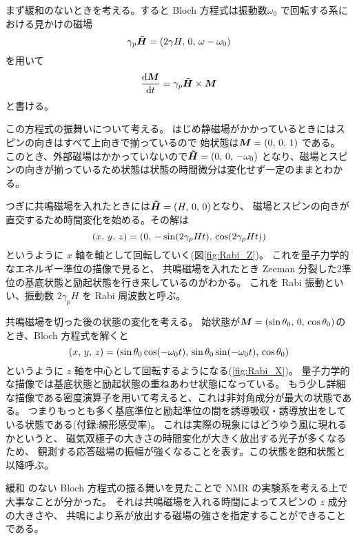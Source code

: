 \documentclass[11pt,dvipdfmx,a4paper]{jsarticle}
\begin{document}
まず緩和のないときを考える。すると Bloch 方程式は振動数\(\omega_0\) %
で回転する系における見かけの磁場
\begin{equation}
	\gamma_p \vb*{\tilde{H}} = \qty(2\gamma H,\,0,\,\omega-\omega_0)
\end{equation}
を用いて
\begin{equation}
	\dv{\vb*{M}}{t} = \gamma_p \vb*{\tilde{H}} \times \vb*{M}
\end{equation}
と書ける。

この方程式の振舞いについて考える。
はじめ静磁場がかかっているときにはスピンの向きはすべて上向きで揃っているので
始状態は\(\vb*{M}=(0,\,0,\,1)\)
である。
このとき、外部磁場はかかっていないので\(\vb*{\tilde{H}}=(0,\,0,\,-\omega_0)\)
となり、磁場とスピンの向きが揃っているため状態は状態の時間微分は変化せず一定のままとわかる。

つぎに共鳴磁場を入れたときには\(\vb*{\tilde{H}}=(H,\,0,\,0)\)となり、
磁場とスピンの向きが直交するため時間変化を始める。その解は
\begin{equation}
	(x,\,y,\,z) = \qty(0,\,-\sin(2\gamma_p Ht),\,\cos(2\gamma_p Ht))
\end{equation}
というように \(x\) 軸を軸として回転していく(図\ref{fig:Rabi_Z})。
これを量子力学的なエネルギー準位の描像で見ると、
共鳴磁場を入れたとき Zeeman 分裂した2準位の基底状態と励起状態を行き来しているのがわかる。
これを Rabi 振動といい、振動数 \(2\gamma_p H\) を Rabi 周波数と呼ぶ。

共鳴磁場を切った後の状態の変化を考える。
始状態が\(\vb*{M}=(\sin\theta_0,\,0,\,\cos\theta_0)\)のとき、Bloch 方程式を解くと
\begin{equation}
	(x,\,y,\,z) =
	\qty(\sin\theta_0\cos(-\omega_0 t),\,
	\sin\theta_0\sin(-\omega_0 t),\,\cos\theta_0)
\end{equation}
というように \(z\) 軸を中心として回転するようになる(\ref{fig:Rabi_X})。
量子力学的な描像では基底状態と励起状態の重ねあわせ状態になっている。
もう少し詳細な描像である密度演算子を用いて考えると、これは非対角成分が最大の状態である。
つまりもっとも多く基底準位と励起準位の間を誘導吸収・誘導放出をしている状態である(付録:線形感受率)。
これは実際の現象にはどうゆう風に現れるかというと、
磁気双極子の大きさの時間変化が大きく放出する光子が多くなるため、
観測する応答磁場の振幅が強くなることを表す。この状態を飽和状態と以降呼ぶ。

緩和 のない Bloch 方程式の振る舞いを見たことで NMR の実験系を考える上で大事なことが分かった。
それは共鳴磁場を入れる時間によってスピンの \(z\) 成分の大きさや、
共鳴により系が放出する磁場の強さを指定することができることである。
\end{document}
